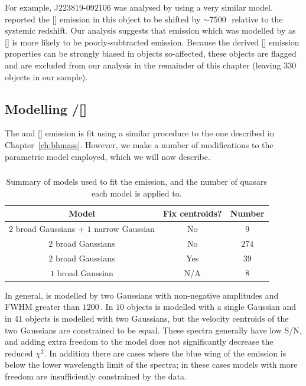 For example, J$223819$-$092106$ was analysed by \citet{shen16a} using a very similar model. 
\citet{shen16a} reported the [] emission in this object to be shifted by $\sim7500$\,\kms\, relative to the \citet{hewett10} systemic redshift. 
Our analysis suggests that emission which was modelled by \citet{shen16a} as [] is more likely to be poorly-subtracted  emission.  
Because the derived [] emission properties can be strongly biased in objects so-affected, these objects are flagged and are excluded from our analysis in the remainder of this chapter (leaving $330$ objects in our sample). 

\subsection{Modelling \hbns/[]}
\label{sec:oiiimodel}

The \hb and [] emission is fit using a similar procedure to the one described in Chapter~\ref{ch:bhmass}. 
However, we make a number of modifications to the parametric model employed, which we will now describe. 

\subsubsection{\hb}

\begin{table}
  \centering
  \footnotesize 
  \caption{Summary of models used to fit the \hb emission, and the number of quasars each model is applied to.}
  \label{tab:hbmod}
    \begin{tabular}{ccc} 
    \hline
    Model & Fix centroids? & Number \\
    \hline
    $2$ broad Gaussians + $1$ narrow Gaussian & No & $9$ \\
    $2$ broad Gaussians & No  &  $274$ \\
    $2$ broad Gaussians & Yes &  $39$ \\
    $1$ broad Gaussian  & N/A &  $8$ \\
    \hline
    \end{tabular}
\end{table} 

In general, \hb is modelled by two Gaussians with non-negative amplitudes and FWHM greater than $1200$\,\kms.
In $10$ objects \hb is modelled with a single Gaussian and in $41$ objects \hb is modelled with two Gaussians, but the velocity centroids of the two Gaussians are constrained to be equal. 
These spectra generally have low S/N, and adding extra freedom to the model does not significantly decrease the  reduced $\chi^2$.
In addition there are cases where the blue wing of the \hb emission is below the lower wavelength limit of the spectra; in these cases models with more freedom are insufficiently constrained by the data.    

